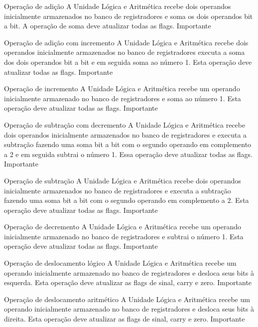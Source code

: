 \documentclass{report}
\begin{document}
      \begin{functional}

     \requirement
      {Operação de adição}
      {A Unidade Lógica e Aritmética recebe dois operandos inicialmente armazenados no banco de registradores e soma os dois operandos bit a bit. A operação de soma deve atualizar todas as flags.}
      {Importante}

     \requirement
      {Operação de adição com incremento}
      {A Unidade Lógica e Aritmética recebe dois operandos inicialmente armazenados no banco de registradores executa a soma dos dois operandos bit a bit e em seguida soma  ao número 1. Esta operação deve atualizar todas as flags.}
      {Importante}
      
      \requirement
      {Operação de incremento}
      {A Unidade Lógica e Aritmética recebe um operando inicialmente armazenado no banco de registradores e soma ao número 1. Esta operação deve atualizar todas as flags.}
      {Importante}
      
      \requirement
      {Operação de subtração com decremento}
      {A Unidade Lógica e Aritmética recebe dois operandos inicialmente armazenados no banco de registradores e executa a subtração fazendo uma soma  bit a bit com o segundo operando em complemento a 2 e em seguida subtrai o número 1. Essa operação deve atualizar todas as flags.}
      {Importante}
      
      \requirement
      {Operação de subtração}
      {A Unidade Lógica e Aritmética recebe dois operandos inicialmente armazenados no banco de registradores e executa a subtração fazendo uma soma  bit a bit com o segundo operando em complemento a 2. Esta operação deve atualizar todas as flags.}
      {Importante}
      
      \requirement
      {Operação de decremento}
      {A Unidade Lógica e Aritmética recebe um operando inicialmente armazenado no banco de registradores e subtrai o número 1. Esta operação deve atualizar todas as flags.}
      {Importante}
      
       \requirement
      {Operação de deslocamento lógico}
      {A Unidade Lógica e Aritmética recebe um operando inicialmente armazenado no banco de registradores e desloca seus bits à esquerda. Esta operação deve atualizar as flags de sinal, carry e zero.}
      {Importante}
      
       \requirement
      {Operação de deslocamento aritmético}
      {A Unidade Lógica e Aritmética recebe um operando inicialmente armazenado no banco de registradores e desloca seus bits à direita. Esta operação deve atualizar as flags de sinal, carry e zero.}
      {Importante}
      

\end{functional}
\end{document}
